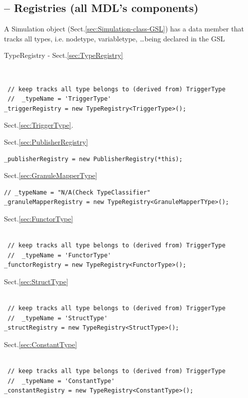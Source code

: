 \subsection{-- Registries (all MDL's components)}
\label{sec:Simulation-Registries}

A Simulation object (Sect.\ref{sec:Simulation-class-GSL}) has a data member that tracks all types, i.e.
nodetype, variabletype, \ldots being declared in the GSL

TypeRegistry - Sect.\ref{sec:TypeRegistry}
\begin{lstlisting}

\end{lstlisting}

\begin{verbatim}

 // keep tracks all type belongs to (derived from) TriggerType
 //  _typeName = 'TriggerType'
_triggerRegistry = new TypeRegistry<TriggerType>();
\end{verbatim}
Sect.\ref{sec:TriggerType}.

Sect.\ref{sec:PublisherRegistry}
\begin{verbatim}
_publisherRegistry = new PublisherRegistry(*this);
\end{verbatim}

Sect.\ref{sec:GranuleMapperType}
\begin{verbatim}
// _typeName = "N/A(Check TypeClassifier"
_granuleMapperRegistry = new TypeRegistry<GranuleMapperTYpe>();
\end{verbatim}

Sect.\ref{sec:FunctorType}
\begin{verbatim}

 // keep tracks all type belongs to (derived from) TriggerType
 //  _typeName = 'FunctorType'
_functorRegistry = new TypeRegistry<FunctorType>();
\end{verbatim}

Sect.\ref{sec:StructType}
\begin{verbatim}

 // keep tracks all type belongs to (derived from) TriggerType
 //  _typeName = 'StructType'
_structRegistry = new TypeRegistry<StructType>();
\end{verbatim}

Sect.\ref{sec:ConstantType}
\begin{verbatim}

 // keep tracks all type belongs to (derived from) TriggerType
 //  _typeName = 'ConstantType'
_constantRegistry = new TypeRegistry<ConstantType>();
\end{verbatim}

